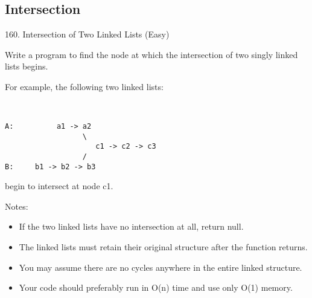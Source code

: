 \documentclass[../main.tex]{subfiles}
\begin{document}
\subsection{Intersection}

160. Intersection of Two Linked Lists (Easy)

Write a program to find the node at which the intersection of two singly linked lists begins.

For example, the following two linked lists:
\begin{lstlisting}[numbers=none]

        
A:          a1 -> a2
                  \
                     c1 -> c2 -> c3
                  /            
B:     b1 -> b2 -> b3
\end{lstlisting}

begin to intersect at node c1.

Notes:
\begin{itemize}
    \item If the two linked lists have no intersection at all, return null.
    \item The linked lists must retain their original structure after the function returns.
    \item You may assume there are no cycles anywhere in the entire linked structure.
    \item Your code should preferably run in O(n) time and use only O(1) memory.
\end{itemize}
\end{document}
